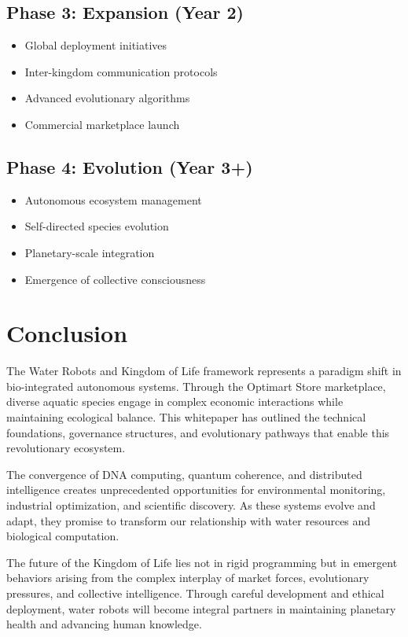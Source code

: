 \documentclass[11pt,a4paper]{article}
\begin{document}
\subsection{Phase 3: Expansion (Year 2)}
\begin{itemize}
    \item Global deployment initiatives
    \item Inter-kingdom communication protocols
    \item Advanced evolutionary algorithms
    \item Commercial marketplace launch
\end{itemize}

\subsection{Phase 4: Evolution (Year 3+)}
\begin{itemize}
    \item Autonomous ecosystem management
    \item Self-directed species evolution
    \item Planetary-scale integration
    \item Emergence of collective consciousness
\end{itemize}

\section{Conclusion}

The Water Robots and Kingdom of Life framework represents a paradigm shift in bio-integrated autonomous systems. Through the Optimart Store marketplace, diverse aquatic species engage in complex economic interactions while maintaining ecological balance. This whitepaper has outlined the technical foundations, governance structures, and evolutionary pathways that enable this revolutionary ecosystem.

The convergence of DNA computing, quantum coherence, and distributed intelligence creates unprecedented opportunities for environmental monitoring, industrial optimization, and scientific discovery. As these systems evolve and adapt, they promise to transform our relationship with water resources and biological computation.

The future of the Kingdom of Life lies not in rigid programming but in emergent behaviors arising from the complex interplay of market forces, evolutionary pressures, and collective intelligence. Through careful development and ethical deployment, water robots will become integral partners in maintaining planetary health and advancing human knowledge.
\end{document}
